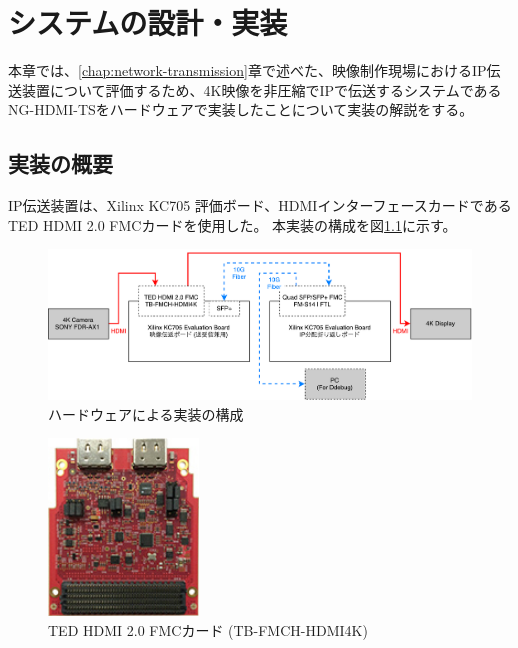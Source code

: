 \chapter{システムの設計・実装}
\label{chap:implementation}

本章では、\ref{chap:network-transmission}章で述べた、映像制作現場におけるIP伝送装置について評価するため、4K映像を非圧縮でIPで伝送するシステムであるNG-HDMI-TSをハードウェアで実装したことについて実装の解説をする。

\section{実装の概要}

IP伝送装置は、Xilinx KC705 評価ボード\cite{xilinx-kc705}、HDMIインターフェースカードであるTED HDMI 2.0 FMCカード\cite{ted-hdmi4k}を使用した。
本実装の構成を図\ref{fig:fpga-implement-flow}に示す。

\begin{figure}[htbp]
  \begin{center}
    \includegraphics[bb=0 0 841 299,width=15.5cm]{img/fpga-implement-flow.pdf}
  \end{center}
  \caption{ハードウェアによる実装の構成}
  \label{fig:fpga-implement-flow}
\end{figure}

\begin{figure}[htbp]
  \begin{center}
    \includegraphics[bb=0 0 137 161,width=4cm]{img/ted-4k-fmc-card.jpg}
  \end{center}
  \caption{TED HDMI 2.0 FMCカード (TB-FMCH-HDMI4K)}
  \label{fig:ted-4k-fmc-card}
\end{figure}

